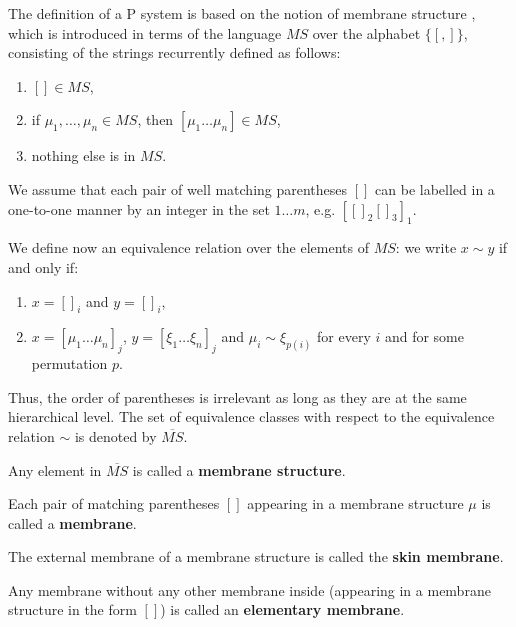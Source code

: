 The definition of a P system is based on the notion of  membrane structure \cite{Besozzi:PhD:2004}, which is introduced in terms of the language $MS$ over the alphabet $\{[, ]\}$, consisting of the strings recurrently defined as follows:
\begin{enumerate}
  \item $[]\in MS$,
  \item if $\mu_1, \ldots, \mu_n \in MS$, then $[\mu_1\ldots\mu_n] \in MS$,
  \item nothing else is in $MS$.
\end{enumerate}

We assume that each pair of well matching parentheses $[]$ can be labelled in a one-to-one manner by an integer in the set $1\ldots m$, e.g. $[[]_2[]_3]_1$.

We define now an equivalence relation over the elements of $MS$: we write $x\sim y$ if and only if:
\begin{enumerate}
  \item $x=[]_i$ and $y=[]_i$,
  \item $x=[\mu_1\ldots\mu_n]_j$, $y=[\xi_1\ldots\xi_n]_j$ and $\mu_i\sim\xi_{p(i)}$ for every $i$ and for some permutation $p$.
\end{enumerate}

Thus, the order of parentheses is irrelevant as long as they are at the same hierarchical level. The set of equivalence classes with respect to the equivalence relation $\sim$ is denoted by $\overline{MS}$.

\begin{definition}
  Any element in $\overline{MS}$ is called a {\bf membrane structure}.
\end{definition}

\begin{definition}
  Each pair of matching parentheses $[]$ appearing in a membrane structure $\mu$ is called a  {\bf membrane}.
\end{definition}

\begin{definition}
  The external membrane of a membrane structure is called the  {\bf skin membrane}.
\end{definition}

\begin{definition}
  Any membrane without any other membrane inside (appearing in a membrane structure in the form $[]$) is called an  {\bf elementary membrane}.
\end{definition}

